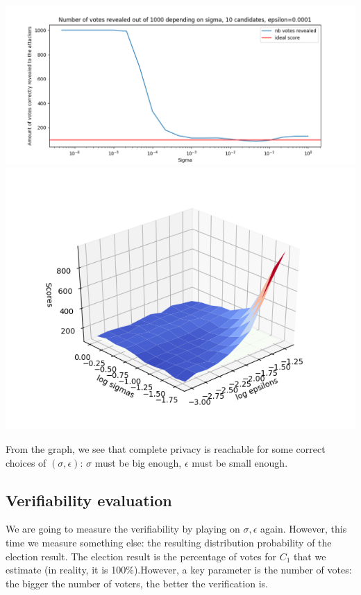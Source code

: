 \documentclass{article}
\begin{document}
\includegraphics[scale=0.5]{distribution_proba/influence_sigma.png}
\includegraphics[scale=0.8]{distribution_proba/influence_sigma_epsilon.png}


From the graph, we see that complete privacy is reachable for some correct choices of $(\sigma, \epsilon)$: $\sigma$ must be big enough, $\epsilon$ must be small enough.

\subsection{Verifiability evaluation}


We are going to measure the verifiability by playing on $\sigma, \epsilon$ again. However, this time we measure something else: the resulting distribution probability of the election result. The election result is the percentage of votes for $C_1$ that we estimate (in reality, it is 100\%).However, a key parameter is the number of votes: the bigger the number of voters, the better the verification is.
\end{document}
